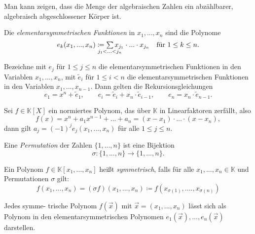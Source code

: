 \documentclass{cheat-sheet}
\newcommand{\K}{\mathbb{K}} %
\begin{document}
\begin{bem}
  Man kann zeigen, dass die Menge der algebraischen Zahlen ein abzählbarer, algebraisch abgeschlossener Körper ist.
\end{bem}


\begin{defn}
  Die \emph{elementarsymmetrischen Funktionen} in $x_1, ..., x_n$ sind die Polynome
  \[
    e_k(x_1, ..., x_n) \coloneqq \sum_{\mathclap{j_1 < ... < j_n}} x_{j_1} \cdot ... \cdot x_{j_n}
    \quad \text{für $1 \leq k \leq n$.}
  \]
\end{defn}

\begin{bem}
  Bezeichne mit $e_j$ für $1 \leq j \leq n$ die elementarsymmetrischen Funktionen in den Variablen $x_1, ..., x_n$, mit $\tilde{e}_i$ für $1 \leq i < n$ die elementarsymmetrischen Funktionen in den Variablen $x_1, ..., x_{n-1}$. Dann gelten die Rekursionsgleichungen
  \[
    e_1 = x^n + \tilde{e}_1, \qquad
    e_i = \tilde{e}_i + x_n \cdot \tilde{e}_{i-1}, \qquad
    e_n = x_n \cdot \tilde{e}_{n-1}.
  \]
\end{bem}

\begin{satz}[Vieta]
  Sei $f \in \K[X]$ ein normiertes Polynom, das über $\K$ in Linearfaktoren zerfällt, also
  \[ f(x) = x^n + a_1 x^{n-1} + ... + a_n = (x-x_1) \cdot ... \cdot (x-x_n), \]
  dann gilt $a_j = (-1)^j e_j(x_1, ..., x_n)$ für alle $1 \leq j \leq n$.
\end{satz}

\begin{defn}
  Eine \emph{Permutation} der Zahlen $\{ 1, ..., n \}$ ist eine Bijektion
  \[ \sigma : \{ 1, ..., n \} \to \{ 1, ..., n \}. \]
\end{defn}

\begin{defn}
  Ein Polynom $f \in \K[x_1, ..., x_n]$ heißt \emph{symmetrisch}, falls für alle $x_1, ..., x_n \in \K$ und Permutationen $\sigma$ gilt:
  \[ f(x_1, ..., x_n) = (\sigma f)(x_1, ..., x_n) \coloneqq f(x_{\sigma(1)}, ...., x_{\sigma(n)}) \]
\end{defn}


\begin{satz}
  Jedes symme- trische Polynom $f(\vec{x})$ mit $\vec{x} = (x_1, ..., x_n)$ lässt sich als Polynom in den elementarsymmetrischen Polynomen $e_1(\vec{x}), ..., e_n(\vec{x})$ darstellen.
\end{satz}
\end{document}
